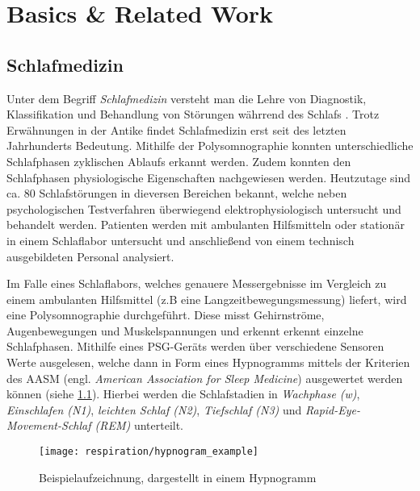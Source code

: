 
\chapter{Basics \& Related Work}
\label{ch:Basics}

\section{Schlafmedizin}
\label{ch:Basics:se:schlafmedizin}
Unter dem Begriff \textit{Schlafmedizin} versteht man die Lehre von Diagnostik, Klassifikation und Behandlung von Störungen währrend des Schlafs \cite{schlafmedizin_1x1}. 
Trotz Erwähnungen in der Antike findet Schlafmedizin erst seit des letzten Jahrhunderts Bedeutung.
Mithilfe der Polysomnographie konnten unterschiedliche Schlafphasen zyklischen Ablaufs erkannt werden.
Zudem konnten den Schlafphasen physiologische Eigenschaften nachgewiesen werden.
Heutzutage sind ca. 80 Schlafstörungen in dieversen Bereichen bekannt, welche neben psychologischen Testverfahren überwiegend elektrophysiologisch untersucht und behandelt werden.
Patienten werden mit ambulanten Hilfsmitteln oder stationär in einem Schlaflabor untersucht und anschließend von einem technisch ausgebildeten Personal analysiert.

Im Falle eines Schlaflabors, welches genauere Messergebnisse im Vergleich zu einem ambulanten Hilfsmittel (z.B eine Langzeitbewegungsmessung) liefert, wird eine Polysomnographie durchgeführt.
Diese misst Gehirnströme, Augenbewegungen und Muskelspannungen und erkennt erkennt einzelne Schlafphasen.
Mithilfe eines PSG-Geräts werden über verschiedene Sensoren Werte ausgelesen, welche dann in Form eines Hypnogramms mittels der Kriterien des AASM (engl. \textit{American Association for Sleep Medicine}) ausgewertet werden können (siehe \ref{hypnogram_example}). 
Hierbei werden die Schlafstadien in \textit{Wachphase (w)}, \textit{Einschlafen (N1)}, \textit{leichten Schlaf (N2)}, \textit{Tiefschlaf (N3)} und \textit{Rapid-Eye-Movement-Schlaf (REM)} unterteilt.

\begin{figure}[ht]
    \centering
    \texttt{[image: respiration/hypnogram\_example]}
    \caption{Beispielaufzeichnung, dargestellt in einem Hypnogramm \cite{praxis_der_schlafmedizin}}
    \label{hypnogram_example}
\end{figure}

